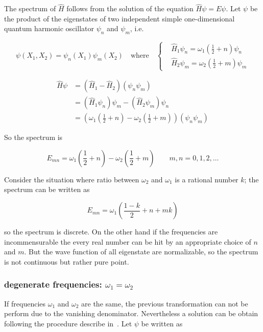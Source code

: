 The spectrum of $\hat{H}$ follows from the solution of the equation
$\hat{H} \psi = E \psi$. Let $\psi$ be the product of the eigenstates of two
independent simple one-dimensional quantum harmonic oscillator $\psi_n$ and
$\psi_m$, i.e.

\begin{equation*}
  \psi(X_1, X_2) = \psi_n(X_1) \psi_m(X_2)
  \quad \text{where} \quad
  \begin{cases}
    &\hat{H}_1\psi_n = \omega_1 \left( \frac{1}{2} + n \right)\psi_n \\
    &\hat{H}_2\psi_m = \omega_2 \left( \frac{1}{2} + m \right)\psi_m
  \end{cases}
\end{equation*}

\begin{align*}
  \hat{H} \psi
  &= \left(\hat{H}_1 - \hat{H}_2\right) \left(\psi_n \psi_m\right) \\
  &= \left(\hat{H}_1\psi_n\right)\psi_m - \left(\hat{H}_2\psi_m\right)\psi_n \\
  &= \left(
    \omega_1\left(\frac{1}{2} + n\right) -
    \omega_2\left(\frac{1}{2} + m\right)
     \right) \left(\psi_n\psi_m\right)
\end{align*}



So the spectrum is

\begin{equation}
  E_{mn} =
  \omega_1 \left( \frac{1}{2} + n \right) -
  \omega_2 \left( \frac{1}{2} + m \right)
  \qquad m,n = 0,1,2,\ldots
\end{equation}

Consider the situation where ratio between $\omega_2$ and $\omega_1$ is a
rational number $k$; the spectrum can be written as

\begin{equation*}
  E_{mn} = \omega_1 \left( \frac{1-k}{2} + n + mk \right)
\end{equation*}

so the spectrum is discrete. On the other hand if the frequencies are
incommensurable the every real number can be hit by an appropriate choice of
$n$ and $m$. But the wave function of all eigenstate are normalizable, so the
spectrum is not continuous but rather pure point.


\subsubsection{degenerate frequencies: $\omega_1 = \omega_2$}
If frequencies $\omega_1$ and $\omega_2$ are the same, the previous
transformation can not be perform due to the vanishing denominator. Nevertheless
a solution can be obtain following the procedure describe in~\cite{PU50,
Bolonek06}. Let $\psi$ be written as

